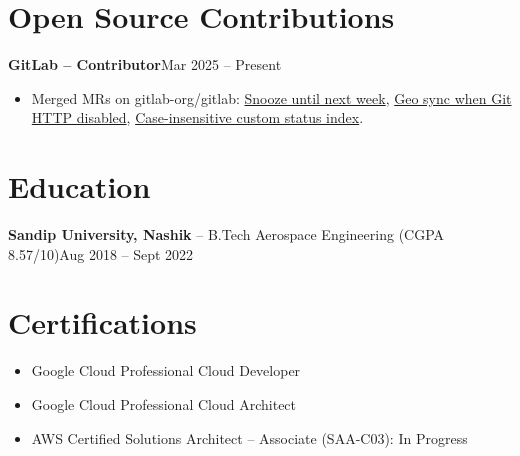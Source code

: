 \documentclass[9pt,letterpaper]{extarticle}
\begin{document}
\section*{Open Source Contributions}
\noindent\textbf{GitLab -- Contributor}\hfill Mar 2025 -- Present
\begin{itemize}
  \item Merged MRs on gitlab-org/gitlab:
        \href{https://gitlab.com/gitlab-org/gitlab/-/merge_requests/185840}{Snooze until next week},
        \href{https://gitlab.com/gitlab-org/gitlab/-/merge_requests/190260}{Geo sync when Git HTTP disabled},
        \href{https://gitlab.com/gitlab-org/gitlab/-/merge_requests/191707}{Case-insensitive custom status index}.
\end{itemize}

\section*{Education}
\noindent\textbf{Sandip University, Nashik} -- B.Tech Aerospace Engineering (CGPA 8.57/10)\hfill Aug 2018 -- Sept 2022

\section*{Certifications}
\begin{itemize}
  \item Google Cloud Professional Cloud Developer
  \item Google Cloud Professional Cloud Architect
  \item AWS Certified Solutions Architect -- Associate (SAA-C03): In Progress
\end{itemize}
\end{document}
